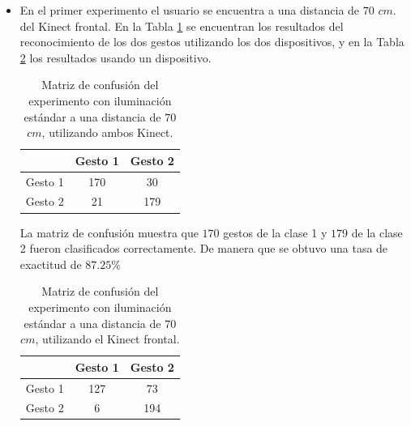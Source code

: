 \begin{itemize}

\item En el primer experimento el usuario se encuentra a una distancia de $70$ $cm.$ del Kinect frontal. En la Tabla \ref{table:70L2K} se encuentran los resultados del reconocimiento de los dos gestos utilizando los dos dispositivos, y en la Tabla \ref{table:70L1K} los resultados usando un dispositivo.  


\begin{table}[h!] 
\begin{center} 
\caption{Matriz de confusión del experimento con iluminación estándar a una distancia de $70$ $cm$, utilizando ambos Kinect.} 
\label{table:70L2K}
\begin{tabular}{ r || c | c |}  
        & Gesto 1 & Gesto 2 \\ \hline \hline  
Gesto 1 & 170  &  30  \\ \hline  
Gesto 2 & 21   & 179 \\   
\end{tabular}
\end{center} 
\end{table}

La matriz de confusión muestra que $170$ gestos de la clase 1 y $179$ de la clase 2 fueron clasificados correctamente. De manera que se obtuvo una tasa de exactitud de $87.25 \%$  

\begin{table}[h!] 
\begin{center}
\caption{Matriz de confusión del experimento con iluminación estándar a una distancia de $70$ $cm$, utilizando el Kinect frontal.}
\label{table:70L1K}
\begin{tabular}{ r || c | c |} 
        & Gesto 1 & Gesto 2 \\ \hline \hline  
Gesto 1 & 127  &  73  \\ \hline  
Gesto 2 & 6    &  194 \\   
\end{tabular}
\end{center} 
\end{table}


\end{itemize}
